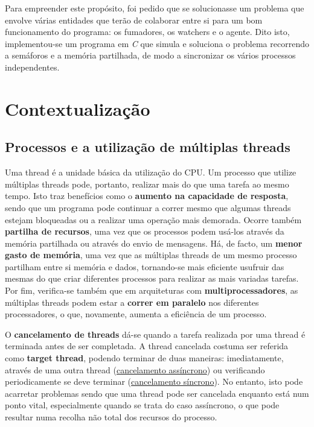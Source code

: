 \documentclass[10pt,portuguese]{article}
\begin{document}
\par Para empreender este propósito, foi pedido que se solucionasse um problema que envolve várias entidades que terão de colaborar entre si para um bom funcionamento do programa: os fumadores, os watchers e o agente. Dito isto, implementou-se um programa em \textit{C} que simula e soluciona o problema recorrendo a semáforos e a memória partilhada, de modo a sincronizar os vários processos independentes. 
\clearpage

\section{Contextualização}
\subsection{Processos e a utilização de múltiplas threads}
Uma thread é a unidade básica da utilização do CPU. Um processo que utilize múltiplas threads pode, portanto, realizar mais do que uma tarefa ao mesmo tempo. Isto traz benefícios como o \textbf{aumento na capacidade de resposta}, sendo que um programa pode continuar a correr mesmo que algumas threads estejam bloqueadas ou a realizar uma operação mais demorada. Ocorre também \textbf{partilha de recursos}, uma vez que os processos podem usá-los através da memória partilhada ou através do envio de mensagens. Há, de facto, um \textbf{menor gasto de memória}, uma vez que as múltiplas threads de um mesmo processo partilham entre si memória e dados, tornando-se mais eficiente usufruir das mesmas do que criar diferentes processos para realizar as mais variadas tarefas. Por fim, verifica-se também que em arquiteturas com \textbf{multiprocessadores}, as múltiplas threads podem estar a \textbf{correr em paralelo} nos diferentes processadores, o que, novamente, aumenta a eficiência de um processo.
\par O \textbf{cancelamento de threads} dá-se quando a tarefa realizada por uma thread é terminada antes de ser completada. A thread cancelada costuma ser referida como \textbf{target thread}, podendo terminar de duas maneiras: imediatamente, através de uma outra thread (\underline{cancelamento assíncrono}) ou verificando periodicamente se deve terminar (\underline{cancelamento síncrono}). No entanto, isto pode acarretar problemas sendo que uma thread pode ser cancelada enquanto está num ponto vital, especialmente quando se trata do caso assíncrono, o que pode resultar numa recolha não total dos recursos do processo.
\end{document}
